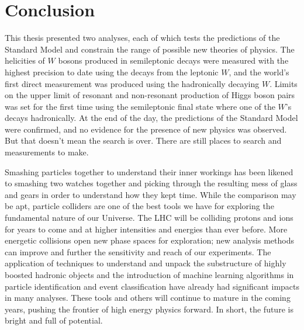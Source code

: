 \chapter{Conclusion}
This thesis presented two analyses, each of which tests the predictions of the Standard Model and constrain the range of possible new theories of physics. The helicities of $W$ bosons produced in semileptonic \ttbar decays were measured with the highest precision to date using the decays from the leptonic $W$, and the world's first direct measurement was produced using the hadronically decaying $W$. Limits on the upper limit of resonant and non-resonant production of Higgs boson pairs was set for the first time using the semileptonic \bbWW final state where one of the $W$'s decays hadronically. At the end of the day, the predictions of the Standard Model were confirmed, and no evidence for the presence of new physics was observed. But that doesn't mean the search is over. There are still places to search and measurements to make. 

Smashing particles together to understand their inner workings has been likened to smashing two watches together and picking through the resulting mess of glass and gears in order to understand how they kept time. While the comparison may be apt, particle colliders are one of the best tools we have for exploring the fundamental nature of our Universe. The LHC will be colliding protons and ions for years to come and at higher intensities and energies than ever before. More energetic collisions open new phase spaces for exploration; new analysis methods can improve and further the sensitivity and reach of our experiments. The application of techniques to understand and unpack the substructure of highly boosted hadronic objects and the introduction of machine learning algorithms in particle identification and event classification have already had significant impacts in many analyses. These tools and others will continue to mature in the coming years, pushing the frontier of high energy physics forward. In short, the future is bright and full of potential.

